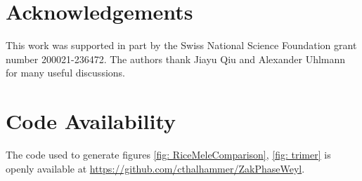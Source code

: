 \documentclass[a4paper,reqno,twoside]{amsart}
\numberwithin{equation}{section}
\theoremstyle{definition}
\newcommand{\<}{\ensuremath \leq}
\renewcommand{\>}{\ensuremath \geq}
\begin{document}




\section{Acknowledgements}
This work was supported in part by the Swiss National Science Foundation grant number 200021-236472. The authors thank  Jiayu Qiu and Alexander Uhlmann for many useful discussions.

\section{Code Availability}
The code used to generate figures \ref{fig: RiceMeleComparison}, \ref{fig: trimer} is openly available at \url{https://github.com/cthalhammer/ZakPhaseWeyl}.

\appendix


\printbibliography
\end{document}
